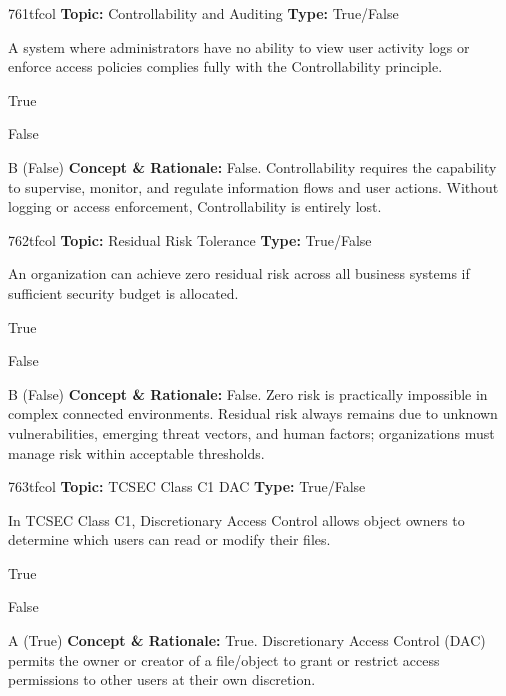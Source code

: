 \begin{qcard}{761}{tfcol}
\textcolor{darkslate!75}{\small\textbf{Topic:} Controllability and Auditing \hfill \textbf{Type:} True/False}\vspace{0.4em}\par
A system where administrators have no ability to view user activity logs or enforce access policies complies fully with the Controllability principle.
\begin{qoptions}
\item True
\item False
\end{qoptions}
\end{qcard}
\nopagebreak
\begin{explainbox}{B (False)}
\textbf{Concept \& Rationale:} False. Controllability requires the capability to supervise, monitor, and regulate information flows and user actions. Without logging or access enforcement, Controllability is entirely lost.
\end{explainbox}

\begin{qcard}{762}{tfcol}
\textcolor{darkslate!75}{\small\textbf{Topic:} Residual Risk Tolerance \hfill \textbf{Type:} True/False}\vspace{0.4em}\par
An organization can achieve zero residual risk across all business systems if sufficient security budget is allocated.
\begin{qoptions}
\item True
\item False
\end{qoptions}
\end{qcard}
\nopagebreak
\begin{explainbox}{B (False)}
\textbf{Concept \& Rationale:} False. Zero risk is practically impossible in complex connected environments. Residual risk always remains due to unknown vulnerabilities, emerging threat vectors, and human factors; organizations must manage risk within acceptable thresholds.
\end{explainbox}

\begin{qcard}{763}{tfcol}
\textcolor{darkslate!75}{\small\textbf{Topic:} TCSEC Class C1 DAC \hfill \textbf{Type:} True/False}\vspace{0.4em}\par
In TCSEC Class C1, Discretionary Access Control allows object owners to determine which users can read or modify their files.
\begin{qoptions}
\item True
\item False
\end{qoptions}
\end{qcard}
\nopagebreak
\begin{explainbox}{A (True)}
\textbf{Concept \& Rationale:} True. Discretionary Access Control (DAC) permits the owner or creator of a file/object to grant or restrict access permissions to other users at their own discretion.
\end{explainbox}

